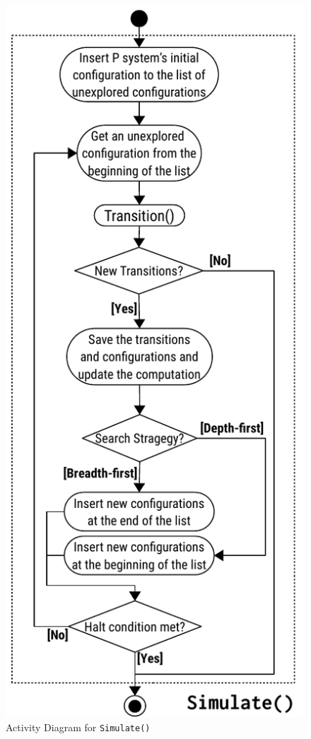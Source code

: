 \documentclass{article}
\begin{document}
\begin{figure}[H]
\begin{center}
\includegraphics[scale=1]{figures/zzz-activity.pdf}
\caption{Activity Diagram for \texttt{Simulate()}}
\label{fig:activity}
\end{center}
\end{figure}
\end{document}
